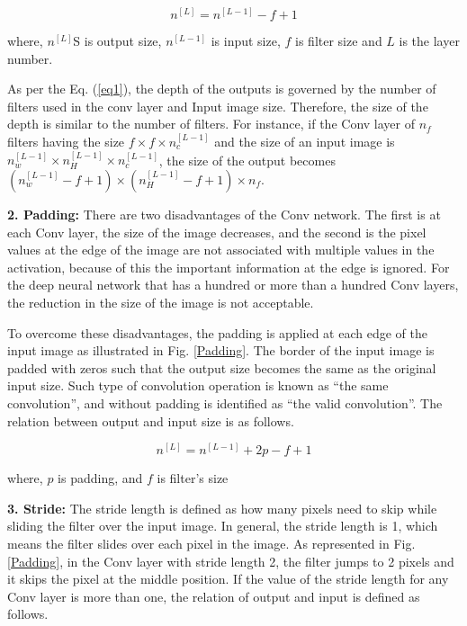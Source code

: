 \begin{equation} \label{eq1}
n^{[L]}=n^{[L-1]}-f+1
\end{equation}

where, $n^{[L]}$S is output size, $n^{[L-1]}$ is input size, $f$ is filter size and $L$ is the layer number.

As per the Eq. (\ref{eq1}), the depth of the outputs is governed by the number of filters used in the conv layer and Input image size. Therefore, the size of the depth is similar to the number of filters. For instance, if the Conv layer of $n_f$ filters having the size $f \times f \times n_c^{[L-1]}$  and the size of an input image is $n_w^{[L-1]} \times n_H^{[L-1]} \times n_c^{[L-1]}$, the size of the output becomes $(n_w^{[L-1]} - f+1) \times (n_H^{[L-1]} - f+1) \times n_f$.

\textbf{2.	Padding:}
There are two disadvantages of the Conv network. The first is at each Conv layer, the size of the image decreases, and the second is the pixel values at the edge of the image are not associated with multiple values in the activation, because of this the important information at the edge is ignored. For the deep neural network that has a hundred or more than a hundred Conv layers, the reduction in the size of the image is not acceptable. 

To overcome these disadvantages, the padding is applied at each edge of the input image as illustrated in Fig. \ref{Padding}. The border of the input image is padded with zeros such that the output size becomes the same as the original input size. Such type of convolution operation is known as “the same convolution”, and without padding is identified as “the valid convolution”. The relation between output and input size is as follows.

\begin{equation} \label{eq2}
n^{[L]}=n^{[L-1]}+2p-f+1
\end{equation}

where, $p$ is padding, and $f$ is filter's size

\textbf{3.	Stride:}
The stride length is defined as how many pixels need to skip while sliding the filter over the input image. In general, the stride length is 1, which means the filter slides over each pixel in the image. As represented in Fig. \ref{Padding}, in the Conv layer with stride length 2, the filter jumps to 2 pixels and it skips the pixel at the middle position. If the value of the stride length for any Conv layer is more than one, the relation of output and input is defined as follows. 


